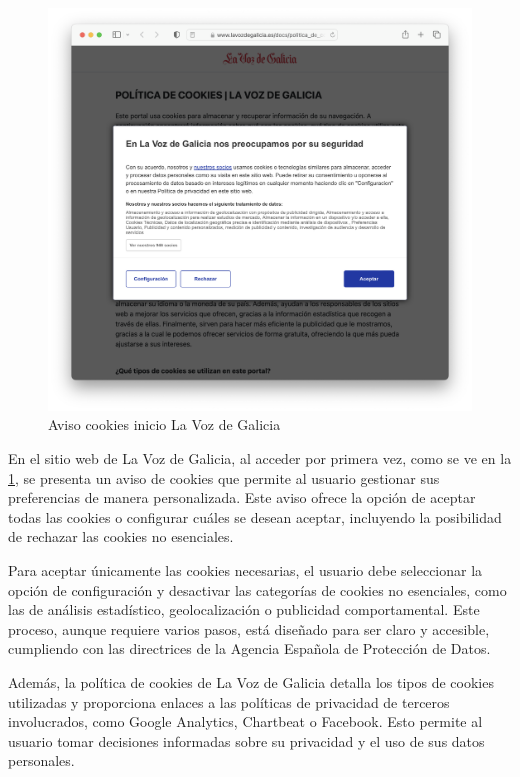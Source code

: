 \begin{figure}[H]   
    \includegraphics[width=15cm]{cookies_voz.png}
    \caption{Aviso cookies inicio La Voz de Galicia}
    \label{fig:cookies_voz}
\end{figure}

En el sitio web de La Voz de Galicia, al acceder por primera vez, como se ve en la \ref{fig:cookies_voz}, se presenta un aviso de cookies que permite al usuario gestionar sus preferencias de manera personalizada. Este aviso ofrece la opción de aceptar todas las cookies o configurar cuáles se desean aceptar, incluyendo la posibilidad de rechazar las cookies no esenciales. 

Para aceptar únicamente las cookies necesarias, el usuario debe seleccionar la opción de configuración y desactivar las categorías de cookies no esenciales, como las de análisis estadístico, geolocalización o publicidad comportamental. Este proceso, aunque requiere varios pasos, está diseñado para ser claro y accesible, cumpliendo con las directrices de la Agencia Española de Protección de Datos. 

Además, la política de cookies de La Voz de Galicia detalla los tipos de cookies utilizadas y proporciona enlaces a las políticas de privacidad de terceros involucrados, como Google Analytics, Chartbeat o Facebook. Esto permite al usuario tomar decisiones informadas sobre su privacidad y el uso de sus datos personales. 

